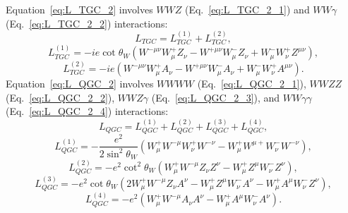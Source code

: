 Equation~\ref{eq:L_TGC_2} involves $WWZ$ (Eq.~\ref{eq:L_TGC_2_1}) and $WW\gamma$ (Eq.~\ref{eq:L_TGC_2_2}) interactions:\\
\begin{equation} \label{eq:L_TGC_2}
L_{TGC} = L_{TGC}^{(1)} + L_{TGC}^{(2)},
\end{equation}
\begin{equation} \label{eq:L_TGC_2_1}
L_{TGC}^{(1)} = -ie \cot \theta_W (W^{-\mu\nu} W^{+}_\mu Z_\nu - W^{+\mu\nu} W^-_\mu Z_\nu +W^-_\mu W^+_\nu Z^{\mu\nu}),
\end{equation}
\begin{equation} \label{eq:L_TGC_2_2}
L_{TGC}^{(2)} = - ie(W^{-\mu\nu}W^+_\mu A_\nu - W^{+\mu\nu}W^-_\mu A_\nu + W^-_\mu W^+_\nu A^{\mu\nu}).
\end{equation}
Equation~\ref{eq:L_QGC_2} involves $WWWW$ (Eq.~\ref{eq:L_QGC_2_1}), $WWZZ$ (Eq.~\ref{eq:L_QGC_2_2}), $WWZ\gamma$ (Eq.~\ref{eq:L_QGC_2_3}), and $WW\gamma\gamma$ (Eq.~\ref{eq:L_QGC_2_4}) interactions:\\
\begin{equation} \label{eq:L_QGC_2}
L_{QGC} = L_{QGC}^{(1)} + L_{QGC}^{(2)} + L_{QGC}^{(3)} + L_{QGC}^{(4)},
\end{equation}
\begin{equation} \label{eq:L_QGC_2_1}
L_{QGC}^{(1)} = -\frac{e^2}{2\sin^2 \theta_W}(W^+_\mu W^{-\mu}W^+_\nu W^{-\nu} - W^+_\mu W^{\mu +} W^-_\nu W^{-\nu}),
\end{equation}
\begin{equation} \label{eq:L_QGC_2_2}
L_{QGC}^{(2)} = - e^2 \cot^2 \theta_W (W^+_\mu W^{-\mu} Z_\nu Z^{\nu} - W^+_\mu Z^{\mu} W^-_\nu Z^{\nu}),
\end{equation}
\begin{equation} \label{eq:L_QGC_2_3}
L_{QGC}^{(3)} = - e^2 \cot \theta_W (2 W_\mu^+ W^{-\mu} Z_\nu A^{\nu} - W^{+}_\mu Z^\mu W^-_\nu A^\nu - W^{+}_\mu A^\mu W^-_\nu Z^\nu),
\end{equation}
\begin{equation} \label{eq:L_QGC_2_4}
L_{QGC}^{(4)} = - e^2 (W^+_\mu W^{-\mu} A_\nu A^{\nu} - W^+_\mu A^{\mu} W^-_\nu A^{\nu}).
\end{equation}
